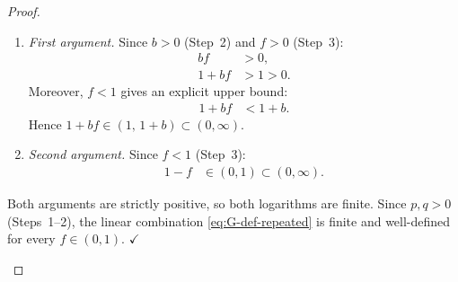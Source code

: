 \documentclass[12pt,openany]{book}
\numberwithin{equation}{chapter}
\theoremstyle{plain}
\theoremstyle{definition}
\theoremstyle{remark}
\numberwithin{equation}{chapter}
\theoremstyle{plain}
\begin{document}
\begin{proof}
\begin{enumerate}[label=\textbf{Step \arabic*.}, leftmargin=*, widest=Step 9]
        \begin{enumerate}[label=(\alph*)]
          \item \emph{First argument.}
                Since $b > 0$ (Step~2) and $f > 0$ (Step~3):
                \begin{align}
                  bf     &> 0,                     \label{eq:bf-pos}\\
                  1 + bf &> 1 > 0.                 \label{eq:arg1-pos}
                \end{align}
                Moreover, $f < 1$ gives an explicit upper bound:
                \begin{align}
                  1 + bf &< 1 + b.                 \label{eq:arg1-upper}
                \end{align}
                Hence $1 + bf \in (1,\, 1+b) \subset (0,\infty)$.

          \item \emph{Second argument.}
                Since $f < 1$ (Step~3):
                \begin{align}
                  1 - f &\in (0,1) \subset (0,\infty). \label{eq:arg2-pos}
                \end{align}
        \end{enumerate}

        Both arguments are strictly positive, so both logarithms
        are finite.  Since $p, q > 0$ (Steps~1--2), the linear
        combination \eqref{eq:G-def-repeated} is finite and
        well-defined for every $f \in (0,1)$. \hfill$\checkmark$


\end{enumerate}
\end{proof}
\end{document}
